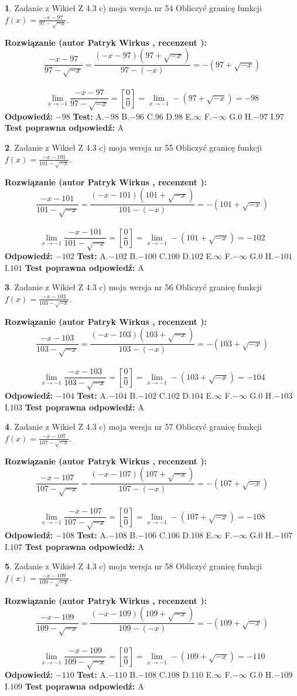 \documentclass[12pt, a4paper]{article}
\theoremstyle{definition} %
\newtheorem{zad}{}
\newcommand{\zadStart}[1]{\begin{zad}#1\newline}
\newcommand{\zadStop}{\end{zad}}
\newcommand{\rozwStart}[2]{\noindent \textbf{Rozwiązanie (autor #1 , recenzent #2): }\newline}
\newcommand{\rozwStop}{\newline}
\newcommand{\odpStart}{\noindent \textbf{Odpowiedź:}\newline}
\newcommand{\odpStop}{\newline}
\newcommand{\testStart}{\noindent \textbf{Test:}\newline}
\newcommand{\testStop}{\newline}
\newcommand{\kluczStart}{\noindent \textbf{Test poprawna odpowiedź:}\newline}
\newcommand{\kluczStop}{\newline}
\begin{document}
\zadStart{Zadanie z Wikieł Z 4.3 c) moja wersja nr 54}
Obliczyć granicę funkcji $f(x)=\frac{-x-97}{97-\sqrt{-x}}$.
\zadStop
\rozwStart{Patryk Wirkus}{}
$$\frac{-x-97}{97-\sqrt{-x}}=\frac{(-x-97)(97+\sqrt{-x})}{97-(-x)}=-(97+\sqrt{-x})$$
\\
$$\lim\limits_{x\to-1}\frac{-x-97}{97-\sqrt{-x}}=[\frac{0}{0}]=\lim\limits_{x\to-1}-(97+\sqrt{-x}) =-98$$
\rozwStop
\odpStart
$-98$
\odpStop
\testStart
A.$-98$
B.$-96$
C.$96$
D.$98$
E.$\infty$
F.$-\infty$
G.$0$
H.$-97$
I.$97$
\testStop
\kluczStart
A
\kluczStop



\zadStart{Zadanie z Wikieł Z 4.3 c) moja wersja nr 55}
Obliczyć granicę funkcji $f(x)=\frac{-x-101}{101-\sqrt{-x}}$.
\zadStop
\rozwStart{Patryk Wirkus}{}
$$\frac{-x-101}{101-\sqrt{-x}}=\frac{(-x-101)(101+\sqrt{-x})}{101-(-x)}=-(101+\sqrt{-x})$$
\\
$$\lim\limits_{x\to-1}\frac{-x-101}{101-\sqrt{-x}}=[\frac{0}{0}]=\lim\limits_{x\to-1}-(101+\sqrt{-x}) =-102$$
\rozwStop
\odpStart
$-102$
\odpStop
\testStart
A.$-102$
B.$-100$
C.$100$
D.$102$
E.$\infty$
F.$-\infty$
G.$0$
H.$-101$
I.$101$
\testStop
\kluczStart
A
\kluczStop



\zadStart{Zadanie z Wikieł Z 4.3 c) moja wersja nr 56}
Obliczyć granicę funkcji $f(x)=\frac{-x-103}{103-\sqrt{-x}}$.
\zadStop
\rozwStart{Patryk Wirkus}{}
$$\frac{-x-103}{103-\sqrt{-x}}=\frac{(-x-103)(103+\sqrt{-x})}{103-(-x)}=-(103+\sqrt{-x})$$
\\
$$\lim\limits_{x\to-1}\frac{-x-103}{103-\sqrt{-x}}=[\frac{0}{0}]=\lim\limits_{x\to-1}-(103+\sqrt{-x}) =-104$$
\rozwStop
\odpStart
$-104$
\odpStop
\testStart
A.$-104$
B.$-102$
C.$102$
D.$104$
E.$\infty$
F.$-\infty$
G.$0$
H.$-103$
I.$103$
\testStop
\kluczStart
A
\kluczStop



\zadStart{Zadanie z Wikieł Z 4.3 c) moja wersja nr 57}
Obliczyć granicę funkcji $f(x)=\frac{-x-107}{107-\sqrt{-x}}$.
\zadStop
\rozwStart{Patryk Wirkus}{}
$$\frac{-x-107}{107-\sqrt{-x}}=\frac{(-x-107)(107+\sqrt{-x})}{107-(-x)}=-(107+\sqrt{-x})$$
\\
$$\lim\limits_{x\to-1}\frac{-x-107}{107-\sqrt{-x}}=[\frac{0}{0}]=\lim\limits_{x\to-1}-(107+\sqrt{-x}) =-108$$
\rozwStop
\odpStart
$-108$
\odpStop
\testStart
A.$-108$
B.$-106$
C.$106$
D.$108$
E.$\infty$
F.$-\infty$
G.$0$
H.$-107$
I.$107$
\testStop
\kluczStart
A
\kluczStop



\zadStart{Zadanie z Wikieł Z 4.3 c) moja wersja nr 58}
Obliczyć granicę funkcji $f(x)=\frac{-x-109}{109-\sqrt{-x}}$.
\zadStop
\rozwStart{Patryk Wirkus}{}
$$\frac{-x-109}{109-\sqrt{-x}}=\frac{(-x-109)(109+\sqrt{-x})}{109-(-x)}=-(109+\sqrt{-x})$$
\\
$$\lim\limits_{x\to-1}\frac{-x-109}{109-\sqrt{-x}}=[\frac{0}{0}]=\lim\limits_{x\to-1}-(109+\sqrt{-x}) =-110$$
\rozwStop
\odpStart
$-110$
\odpStop
\testStart
A.$-110$
B.$-108$
C.$108$
D.$110$
E.$\infty$
F.$-\infty$
G.$0$
H.$-109$
I.$109$
\testStop
\kluczStart
A
\kluczStop
\end{document}
